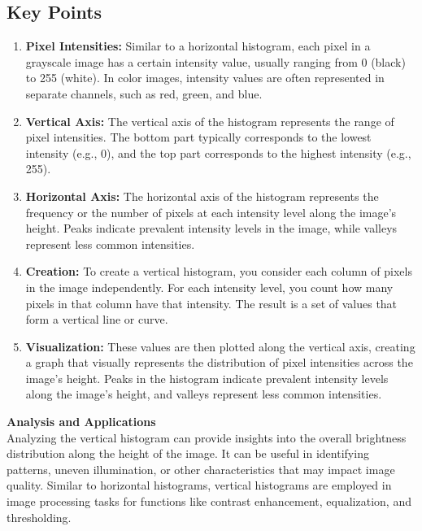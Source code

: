 \documentclass[9pt,twocolumn]{paper-template}
\begin{document}
\subsection*{Key Points}

\begin{enumerate}
	\item \textbf{Pixel Intensities:} Similar to a horizontal histogram, each pixel in a grayscale image has a certain intensity value, usually ranging from 0 (black) to 255 (white). In color images, intensity values are often represented in separate channels, such as red, green, and blue.
	
	\item \textbf{Vertical Axis:} The vertical axis of the histogram represents the range of pixel intensities. The bottom part typically corresponds to the lowest intensity (e.g., 0), and the top part corresponds to the highest intensity (e.g., 255).
	
	\item \textbf{Horizontal Axis:} The horizontal axis of the histogram represents the frequency or the number of pixels at each intensity level along the image's height. Peaks indicate prevalent intensity levels in the image, while valleys represent less common intensities.
	
	\item \textbf{Creation:} To create a vertical histogram, you consider each column of pixels in the image independently. For each intensity level, you count how many pixels in that column have that intensity. The result is a set of values that form a vertical line or curve.
	
	\item \textbf{Visualization:} These values are then plotted along the vertical axis, creating a graph that visually represents the distribution of pixel intensities across the image's height. Peaks in the histogram indicate prevalent intensity levels along the image's height, and valleys represent less common intensities.
\end{enumerate}

\textbf{Analysis and Applications}\\
Analyzing the vertical histogram can provide insights into the overall brightness distribution along the height of the image. It can be useful in identifying patterns, uneven illumination, or other characteristics that may impact image quality. Similar to horizontal histograms, vertical histograms are employed in image processing tasks for functions like contrast enhancement, equalization, and thresholding.
\end{document}
